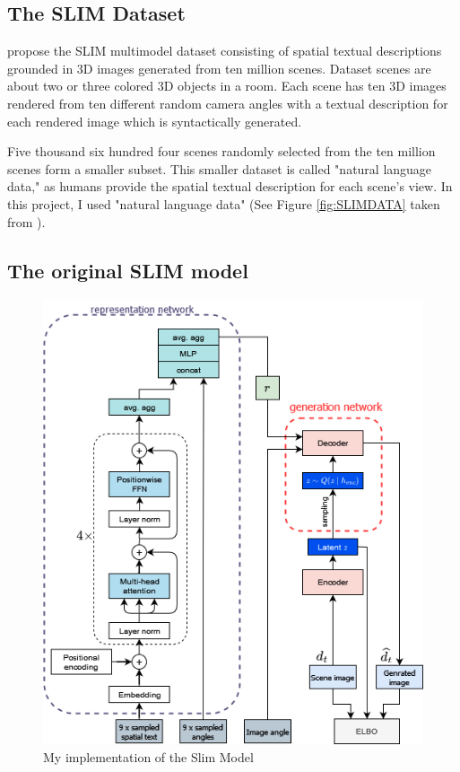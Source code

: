 \documentclass[11pt,a4paper]{article}
\begin{document}
\subsection{The SLIM Dataset}

\citet{ramalho2018encoding} propose the SLIM multimodel dataset consisting of spatial textual descriptions grounded in 3D images generated from ten million scenes. Dataset scenes are about two or three colored 3D objects in a room. Each scene has ten 3D images rendered from ten different random camera angles with a textual description for each rendered image which is syntactically generated. 

Five thousand six hundred four scenes randomly selected from the ten million scenes form a smaller subset. This smaller dataset is called "natural language data," as humans provide the spatial textual description for each scene's view. In this project, I used "natural language data" (See Figure \ref{fig:SLIMDATA} taken from \citealt{ramalho2018encoding}).

\subsection{The original SLIM model}


\begin{figure}[hbt]
    \centering
    \includegraphics[width=.7\linewidth]{SLIMModel.png}
    \caption{My implementation of the Slim Model}
    \label{fig:SLIMModel}
\end{figure}
\end{document}
